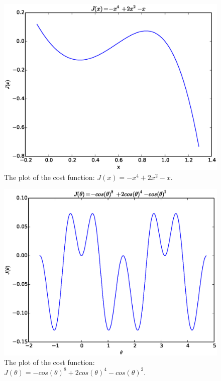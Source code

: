 \documentclass[a4paper,12pt]{article}
\begin{document}
\begin{figure}[H]
\begin{center}
\includegraphics[width=1.0\linewidth]{polynomial.eps}


\end{center}
   \caption{The plot of the cost function: $J(x) =-x^4+2x^2-x$. }
\label{fig:poly_cost}
\end{figure}



\begin{figure}[H]
\begin{center}
\includegraphics[width=1.0\linewidth]{polynomial_sphe.eps}


\end{center}
   \caption{The plot of the cost function: $J(\theta) = -cos(\theta)^8+2cos(\theta)^4-cos(\theta)^2$. }
\label{fig:poly_cost_sphe}
\end{figure}
\end{document}
